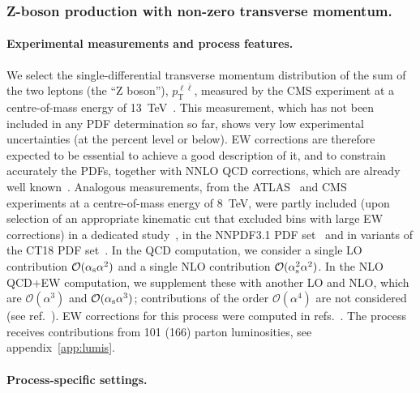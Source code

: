 \subsubsection{Z-boson production with non-zero transverse momentum.}
\label{sec:Zpt}

\paragraph{Experimental measurements and process features.}
We select the single-differential transverse momentum distribution of the
sum of the two leptons (the \enquote{Z boson}), $p_\mathrm{T}^{\ell \bar{\ell}}$, measured by the CMS experiment at a
centre-of-mass energy of \SI{13}{\tera\electronvolt}~\cite{Sirunyan:2019bzr}.
This measurement, which has not been included in any PDF determination so far,
shows very low experimental uncertainties (at the percent level or below).
EW corrections are therefore expected to be essential to achieve a good
description of it, and to constrain accurately the PDFs, together with
NNLO QCD corrections, which are already well
known~\cite{Boughezal:2015ded,Boughezal:2016isb,Boughezal:2016yfp,Ridder:2015dxa,Ridder:2016nkl,Gehrmann-DeRidder:2017mvr,Bizon:2019zgf}.
Analogous measurements,
from the ATLAS~\cite{Aad:2015auj} and CMS~\cite{Khachatryan:2015oaa}
experiments at a centre-of-mass energy of \SI{8}{\tera\electronvolt},
were partly included (upon
selection of an appropriate kinematic cut that excluded bins with large EW
corrections) in a dedicated study~\cite{Boughezal:2017nla},
in the NNPDF3.1 PDF set~\cite{Ball:2017nwa} and in variants of
the CT18 PDF set~\cite{Hou:2019efy}. In the QCD computation, we consider a
single LO contribution $\mathcal{O}(\alpha_\mathrm{s}\alpha^2)$ and a single NLO
contribution $\mathcal{O}(\alpha_\mathrm{s}^2\alpha^2)$. In the NLO QCD+EW computation,
we supplement these with another LO and NLO, which are
$\mathcal{O}(\alpha^3)$ and $\mathcal{O}(\alpha_\mathrm{s}\alpha^3)$;
contributions of the order $\mathcal{O}(\alpha^4)$ are not considered (see ref.~\cite{Denner:2019zfp}).
EW corrections for this process were computed in
refs.~\cite{Kuhn:2005az,Denner:2011vu,Hollik:2015pja,Kallweit:2015dum,Frederix:2018nkq}.
The process receives contributions from 101 (166) parton luminosities,
see appendix~\ref{app:lumis}.

\paragraph{Process-specific settings.}

